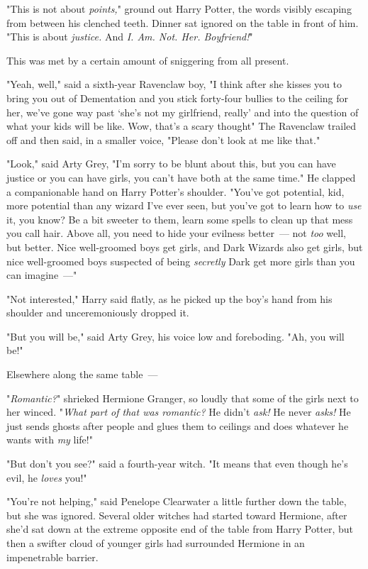 "This is not about \emph{points,}" ground out Harry Potter, the words visibly
escaping from between his clenched teeth. Dinner sat ignored on the table in
front of him. "This is about \emph{justice.} And \emph{I. Am. Not. Her.
Boyfriend!}"

This was met by a certain amount of sniggering from all present.

"Yeah, well," said a sixth-year Ravenclaw boy, "I think after she kisses you to
bring you out of Dementation and you stick forty-four bullies to the ceiling
for her, we've gone way past `she's not my girlfriend, really' and into the
question of what your kids will be like. Wow, that's a scary thought{\el}"
The Ravenclaw trailed off and then said, in a smaller voice, "Please don't look
at me like that."

"Look," said Arty Grey, "I'm sorry to be blunt about this, but you can have
justice or you can have girls, you can't have both at the same time." He
clapped a companionable hand on Harry Potter's shoulder. "You've got potential,
kid, more potential than any wizard I've ever seen, but you've got to learn how
to \emph{use} it, you know? Be a bit sweeter to them, learn some spells to
clean up that mess you call hair. Above all, you need to hide your evilness
better~--- not \emph{too} well, but better. Nice well-groomed boys get girls, and
Dark Wizards also get girls, but nice well-groomed boys suspected of being
\emph{secretly} Dark get more girls than you can imagine~---"

"Not interested," Harry said flatly, as he picked up the boy's hand from his
shoulder and unceremoniously dropped it.

"But you will be," said Arty Grey, his voice low and foreboding. "Ah, you will
be!"

Elsewhere along the same table~---

"\emph{Romantic?}" shrieked Hermione Granger, so loudly that some of the girls
next to her winced. "\emph{What part of that was romantic?} He didn't
\emph{ask!} He never \emph{asks!} He just sends ghosts after people and glues
them to ceilings and does whatever he wants with \emph{my} life!"

"But don't you see?" said a fourth-year witch. "It means that even though he's
evil, he \emph{loves} you!"

"You're not helping," said Penelope Clearwater a little further down the table,
but she was ignored. Several older witches had started toward Hermione, after
she'd sat down at the extreme opposite end of the table from Harry Potter, but
then a swifter cloud of younger girls had surrounded Hermione in an
impenetrable barrier.

